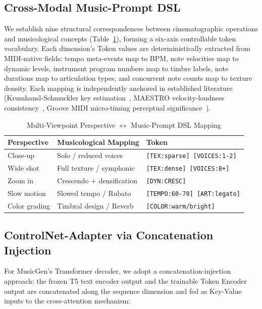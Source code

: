 \documentclass[11pt,twocolumn]{article}
\begin{document}
\subsection{Cross-Modal Music-Prompt DSL}

We establish nine structural correspondences between cinematographic operations and musicological concepts (Table~\ref{tab:mapping}), forming a six-axis controllable token vocabulary. Each dimension's Token values are deterministically extracted from MIDI-native fields: tempo meta-events map to BPM, note velocities map to dynamic levels, instrument program numbers map to timbre labels, note durations map to articulation types, and concurrent note counts map to texture density. Each mapping is independently anchored in established literature (Krumhansl-Schmuckler key estimation~\cite{krumhansl}, MAESTRO velocity-loudness consistency~\cite{maestro}, Groove MIDI micro-timing perceptual significance~\cite{groove}).

\begin{table}[t]
\centering\footnotesize
\caption{Multi-Viewpoint Perspective $\leftrightarrow$ Music-Prompt DSL Mapping}
\label{tab:mapping}
\begin{tabularx}{\columnwidth}{@{}l >{\raggedright\arraybackslash}X >{\raggedright\arraybackslash}X@{}}
\toprule
\textbf{Perspective} & \textbf{Musicological Mapping} & \textbf{Token} \\
\midrule
Close-up & Solo / reduced voices & \texttt{[TEX:sparse] [VOICES:1-2]} \\
Wide shot & Full texture / symphonic & \texttt{[TEX:dense] [VOICES:8+]} \\
Zoom in & Crescendo + densification & \texttt{[DYN:CRESC]} \\
Slow motion & Slowed tempo / Rubato & \texttt{[TEMPO:60-70] [ART:legato]} \\
Color grading & Timbral design / Reverb & \texttt{[COLOR:warm/bright]} \\
\bottomrule
\end{tabularx}
\end{table}

\subsection{ControlNet-Adapter via Concatenation Injection}

For MusicGen's Transformer decoder, we adopt a concatenation-injection approach: the frozen T5 text encoder output and the trainable Token Encoder output are concatenated along the sequence dimension and fed as Key-Value inputs to the cross-attention mechanism:
\end{document}
